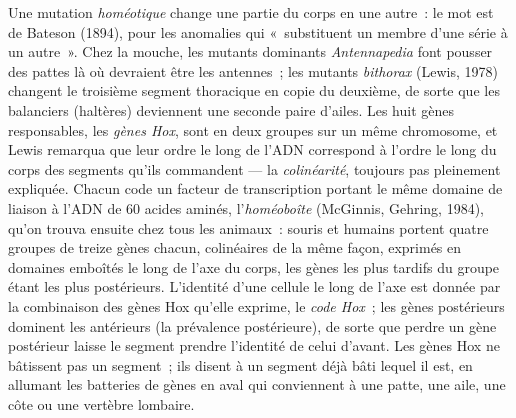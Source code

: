 \begin{definition}\label{def:b3:developmental-genetics:hox}
Une mutation \emph{homéotique} change une partie du corps en une autre~:
le mot est de Bateson (1894), pour les anomalies qui «~substituent un
membre d'une série à un autre~». Chez la mouche, les mutants dominants
\emph{Antennapedia} font pousser des pattes là où devraient être les
antennes~; les mutants \emph{bithorax} (Lewis, 1978) changent le
troisième segment thoracique en copie du deuxième, de sorte que les
balanciers (haltères) deviennent une seconde paire d'ailes. Les huit
gènes responsables, les \emph{gènes Hox}, sont en deux groupes sur un
même chromosome, et Lewis remarqua que leur ordre le long de l'ADN
correspond à l'ordre le long du corps des segments qu'ils commandent ---
la \emph{colinéarité}, toujours pas pleinement expliquée. Chacun code un
facteur de transcription portant le même domaine de liaison à l'ADN de
60 acides aminés, l'\emph{homéoboîte} (McGinnis, Gehring, 1984), qu'on
trouva ensuite chez tous les animaux~: souris et humains portent quatre
groupes de treize gènes chacun, colinéaires de la même façon, exprimés
en domaines emboîtés le long de l'axe du corps, les gènes les plus
tardifs du groupe étant les plus postérieurs. L'identité d'une cellule
le long de l'axe est donnée par la combinaison des gènes Hox qu'elle
exprime, le \emph{code Hox}~; les gènes postérieurs dominent les
antérieurs (la prévalence postérieure), de sorte que perdre un gène
postérieur laisse le segment prendre l'identité de celui d'avant. Les
gènes Hox ne bâtissent pas un segment~; ils disent à un segment déjà
bâti lequel il est, en allumant les batteries de gènes en aval qui
conviennent à une patte, une aile, une côte ou une vertèbre lombaire.
\end{definition}

